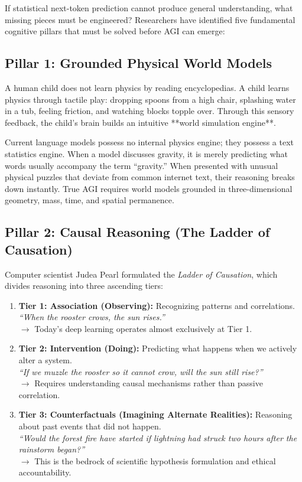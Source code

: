 \documentclass[11pt,journal,onecolumn]{IEEEtran}
\begin{document}
If statistical next-token prediction cannot produce general understanding, what missing pieces must be engineered? Researchers have identified five fundamental cognitive pillars that must be solved before AGI can emerge:

\subsection{Pillar 1: Grounded Physical World Models}
A human child does not learn physics by reading encyclopedias. A child learns physics through tactile play: dropping spoons from a high chair, splashing water in a tub, feeling friction, and watching blocks topple over. Through this sensory feedback, the child's brain builds an intuitive **world simulation engine**.

Current language models possess no internal physics engine; they possess a text statistics engine. When a model discusses gravity, it is merely predicting what words usually accompany the term ``gravity.'' When presented with unusual physical puzzles that deviate from common internet text, their reasoning breaks down instantly. True AGI requires world models grounded in three-dimensional geometry, mass, time, and spatial permanence.

\subsection{Pillar 2: Causal Reasoning (The Ladder of Causation)}
Computer scientist Judea Pearl formulated the \textit{Ladder of Causation}, which divides reasoning into three ascending tiers:

\begin{enumerate}
    \item \textbf{Tier 1: Association (Observing):} Recognizing patterns and correlations. \\
    \textit{``When the rooster crows, the sun rises.''} \\
    $\rightarrow$ Today's deep learning operates almost exclusively at Tier 1.
    
    \item \textbf{Tier 2: Intervention (Doing):} Predicting what happens when we actively alter a system. \\
    \textit{``If we muzzle the rooster so it cannot crow, will the sun still rise?''} \\
    $\rightarrow$ Requires understanding causal mechanisms rather than passive correlation.
    
    \item \textbf{Tier 3: Counterfactuals (Imagining Alternate Realities):} Reasoning about past events that did not happen. \\
    \textit{``Would the forest fire have started if lightning had struck two hours after the rainstorm began?''} \\
    $\rightarrow$ This is the bedrock of scientific hypothesis formulation and ethical accountability.
\end{enumerate}
\end{document}
